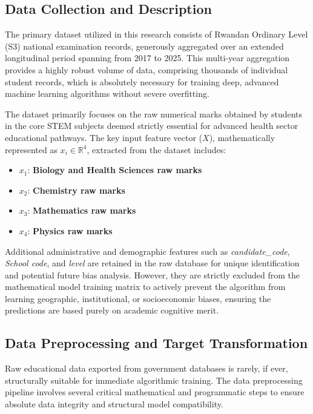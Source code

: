 \subsection{Data Collection and Description}

The primary dataset utilized in this research consists of Rwandan Ordinary Level (S3) national examination records, generously aggregated over an extended longitudinal period spanning from 2017 to 2025. This multi-year aggregation provides a highly robust volume of data, comprising thousands of individual student records, which is absolutely necessary for training deep, advanced machine learning algorithms without severe overfitting.

The dataset primarily focuses on the raw numerical marks obtained by students in the core STEM subjects deemed strictly essential for advanced health sector educational pathways. The key input feature vector ($X$), mathematically represented as $x_i \in \mathbb{R}^4$, extracted from the dataset includes:
\begin{itemize}
    \item $x_1$: \textbf{Biology and Health Sciences raw marks}
    \item $x_2$: \textbf{Chemistry raw marks}
    \item $x_3$: \textbf{Mathematics raw marks}
    \item $x_4$: \textbf{Physics raw marks}
\end{itemize}

Additional administrative and demographic features such as \textit{candidate\_code}, \textit{School code}, and \textit{level} are retained in the raw database for unique identification and potential future bias analysis. However, they are strictly excluded from the mathematical model training matrix to actively prevent the algorithm from learning geographic, institutional, or socioeconomic biases, ensuring the predictions are based purely on academic cognitive merit.

\subsection{Data Preprocessing and Target Transformation}

Raw educational data exported from government databases is rarely, if ever, structurally suitable for immediate algorithmic training. The data preprocessing pipeline involves several critical mathematical and programmatic steps to ensure absolute data integrity and structural model compatibility.

